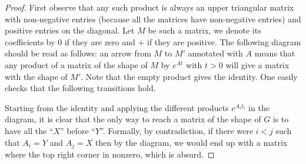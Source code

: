 \begin{proof}
First observe that any such product is always an upper triangular matrix with
non-negative entries (because all the matrices have non-negative entries) and positive
entries on the diagonal. Let $M$ be such a matrix, we denote its coefficients by
$0$ if they are zero and $+$ if they are positive.
The following diagram should be read as follows: an arrow from $M$ to $M'$ annotated with $A$ means that any product
of a matrix of the shape of $M$ by $e^{At}$ with $t>0$ will give a matrix with the shape of $M'$. Note that the empty product gives the identity.
One easily checks that the following transitions hold.
\begin{center}
\end{center}
Starting from the identity and applying the different products $e^{A_it_i}$ in the diagram,
it is clear that the only way to reach a matrix of the shape of $G$ is to have all
the ``$X$'' before ``$Y$''. Formally, by contradiction, if there were $i<j$ such
that $A_i=Y$ and $A_j=X$ then by the diagram, we would end up with a matrix where
the top right corner in nonzero, which is absurd.
\end{proof}

